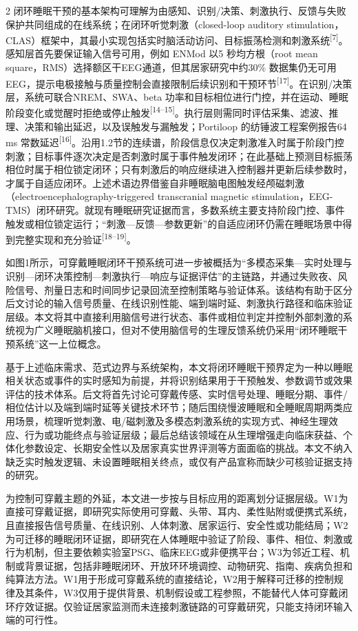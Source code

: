 \documentclass[UTF8,zihao=5,fontset=none]{ctexart}
\newcommand{\hei}{\CJKfamily{hei}}
\newcommand{\leveltwo}[1]{%
  \par\noindent{\hei\fontsize{10.5pt}{15.6pt}\selectfont\bfseries #1\par}}
\newcommand{\refcite}[1]{\nolinebreak[4]\textsuperscript{[#1]}}
\begin{document}
\begin{multicols}{2}
闭环睡眠干预的基本架构可理解为由感知、识别/决策、刺激执行、反馈与失败保护共同组成的在线系统；在闭环听觉刺激（closed-loop auditory stimulation，CLAS）框架中，其最小实现包括实时脑活动访问、目标振荡检测和刺激系统\refcite{7}。感知层首先要保证输入信号可用，例如 ENMod 以5 秒均方根（root mean square，RMS）选择额区干EEG通道，但其居家研究中约30\% 数据集仍无可用EEG，提示电极接触与质量控制会直接限制后续识别和干预环节\refcite{17}。在识别/决策层，系统可联合NREM、SWA、beta 功率和目标相位进行门控，并在运动、睡眠阶段变化或觉醒时拒绝或停止触发\refcite{14--15}。执行层则需同时评估采集、滤波、推理、决策和输出延迟，以及误触发与漏触发；Portiloop 的纺锤波工程案例报告64 ms 常数延迟\refcite{16}。沿用1.2节的连续谱，阶段信息仅决定刺激准入时属于阶段门控刺激；目标事件逐次决定是否刺激时属于事件触发闭环；在此基础上预测目标振荡相位时属于相位锁定闭环；只有刺激后的响应继续进入控制器并更新后续参数时，才属于自适应闭环。上述术语边界借鉴自非睡眠脑电图触发经颅磁刺激（electroencephalography-triggered transcranial magnetic stimulation，EEG-TMS）闭环研究。就现有睡眠研究证据而言，多数系统主要支持阶段门控、事件触发或相位锁定运行；“刺激—反馈—参数更新”的自适应闭环仍需在睡眠场景中得到完整实现和充分验证\refcite{18--19}。

如图1所示，可穿戴睡眠闭环干预系统可进一步被概括为“多模态采集—实时处理与识别—闭环决策控制—刺激执行—响应与证据评估”的主链路，并通过失败夜、风险信号、剂量日志和时间同步记录回流至控制策略与验证体系。该结构有助于区分后文讨论的输入信号质量、在线识别性能、端到端时延、刺激执行路径和临床验证层级。本文将其中直接利用脑信号进行状态、事件或相位判定并控制外部刺激的系统视为广义睡眠脑机接口，但对不使用脑信号的生理反馈系统仍采用“闭环睡眠干预系统”这一上位概念。\par

\leveltwo{1.4 本文综述范围与结构安排}

基于上述临床需求、范式边界与系统架构，本文将闭环睡眠干预界定为一种以睡眠相关状态或事件的实时感知为前提，并将识别结果用于干预触发、参数调节或效果评估的技术体系。后文将首先讨论可穿戴传感、实时信号处理、睡眠分期、事件/相位估计以及端到端时延等关键技术环节；随后围绕慢波睡眠和全睡眠周期两类应用场景，梳理听觉刺激、电/磁刺激及多模态刺激系统的实现方式、神经生理效应、行为或功能终点与验证层级；最后总结该领域在从生理增强走向临床获益、个体化参数设定、长期安全性以及居家真实世界评测等方面面临的挑战。本文不纳入缺乏实时触发逻辑、未设置睡眠相关终点，或仅有产品宣称而缺少可核验证据支持的研究。

为控制可穿戴主题的外延，本文进一步按与目标应用的距离划分证据层级。W1为直接可穿戴证据，即研究实际使用可穿戴、头带、耳内、柔性贴附或便携式系统，且直接报告信号质量、在线识别、人体刺激、居家运行、安全性或功能结局；W2为可迁移的睡眠闭环证据，即研究在人体睡眠中验证了阶段、事件、相位、刺激或行为机制，但主要依赖实验室PSG、临床EEG或非便携平台；W3为邻近工程、机制或背景证据，包括非睡眠闭环、开放环环境调控、动物研究、指南、疾病负担和纯算法方法。W1用于形成可穿戴系统的直接结论，W2用于解释可迁移的控制规律及其条件，W3仅用于提供背景、机制假设或工程参照，不能替代人体可穿戴闭环疗效证据。仅验证居家监测而未连接刺激链路的可穿戴研究，只能支持闭环输入端的可行性。


\end{multicols}
\end{document}
